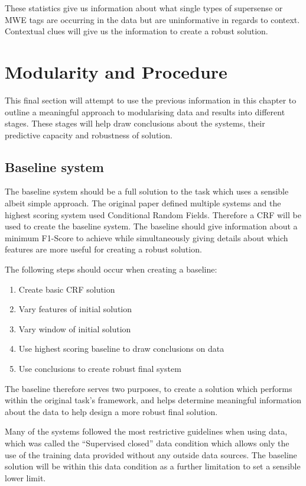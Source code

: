 These statistics give us information about what single types of supersense or MWE tags are occurring in the data but are uninformative in regards to context. Contextual clues will give us the information to create a robust solution. 

\section{Modularity and Procedure}

This final section will attempt to use the previous information in this chapter to outline a meaningful approach to modularising data and results into different stages. These stages will help draw conclusions about the systems, their predictive capacity and robustness of solution.

\subsection{Baseline system}
The baseline system should be a full solution to the task which uses a sensible albeit simple approach. The original paper \cite{Schneider2016} defined multiple systems and the highest scoring system used Conditional Random Fields. Therefore a CRF will be used to create the baseline system. The baseline should give information about a minimum F1-Score to achieve while simultaneously giving details about which features are more useful for creating a robust solution. 

The following steps should occur when creating a baseline:
\begin{enumerate}
  \setlength{\itemsep}{0pt}
  \setlength{\parskip}{0pt}
\item Create basic CRF solution
\item Vary features of initial solution
\item Vary window of initial solution
\item Use highest scoring baseline to draw conclusions on data
\item Use conclusions to create robust final system
\end{enumerate}

The baseline therefore serves two purposes, to create a solution which performs within the original task's framework, and helps determine meaningful information about the data to help design a more robust final solution. 

Many of the systems followed the most restrictive guidelines when using data, which was called the ``Supervised closed'' data condition which allows only the use of the training data provided without any outside data sources. The baseline solution will be within this data condition as a further limitation to set a sensible lower limit. 

